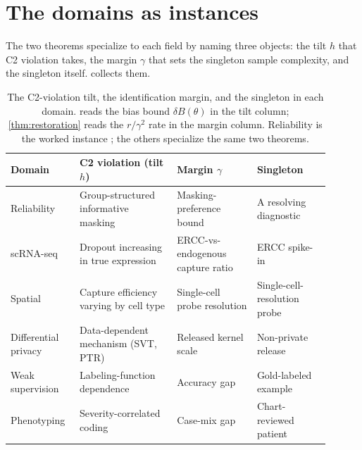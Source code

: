 \section{The domains as instances}
\label{sec:instances}

The two theorems specialize to each field by naming three objects: the tilt $h$
that C2 violation takes, the margin $\gamma$ that sets the singleton sample
complexity, and the singleton itself.  collects them.

\begin{table}[tb]
\centering
\small
\begin{tabular}{@{}p{0.17\linewidth} p{0.29\linewidth} p{0.23\linewidth} p{0.21\linewidth}@{}}
\toprule
\textbf{Domain} & \textbf{C2 violation (tilt $h$)} & \textbf{Margin $\gamma$} & \textbf{Singleton} \\
\midrule
Reliability \citep{towell2026mdrelax} &
  Group-structured informative masking &
  Masking-preference bound &
  A resolving diagnostic \\
scRNA-seq \citep{towell2026scrnacoarsening} &
  Dropout increasing in true expression &
  ERCC-vs-endogenous capture ratio &
  ERCC spike-in \\
Spatial \citep{towell2026spatialcoarsening} &
  Capture efficiency varying by cell type &
  Single-cell probe resolution &
  Single-cell-resolution probe \\
Differential privacy \citep{towell2026dpcoarsening} &
  Data-dependent mechanism (SVT, PTR) &
  Released kernel scale &
  Non-private release \\
Weak supervision \citep{towell2026weaksupcoarsening} &
  Labeling-function dependence &
  Accuracy gap &
  Gold-labeled example \\
Phenotyping \citep{towell2026phenotypecoarsening} &
  Severity-correlated coding &
  Case-mix gap &
  Chart-reviewed patient \\
\bottomrule
\end{tabular}
\caption{The C2-violation tilt, the identification margin, and the singleton in
each domain.  reads the bias bound $\delta B(\theta)$ in the
tilt column; \cref{thm:restoration} reads the $r/\gamma^2$ rate in the margin
column. Reliability is the worked instance \citep{towell2026mdrelax}; the others
specialize the same two theorems.}
\label{tab:instances}
\end{table}

